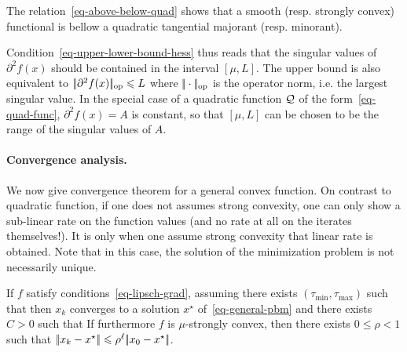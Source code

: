 The relation~\eqref{eq-above-below-quad} shows that a smooth (resp. strongly convex) functional is bellow a quadratic tangential majorant (resp. minorant). 

Condition~\eqref{eq-upper-lower-bound-hess} thus reads that the singular values of $\partial^2 f(x)$ should be contained in the interval $[\mu,L]$. The upper bound is also equivalent to $|\!| \partial^2 f(x) |\!|_{\text{op}} \leqslant L$ where $|\!| \cdot |\!|_{\text{op}}$ is the operator norm, i.e. the largest singular value. 
%
In the special case of a quadratic function $\mathcal{Q}$ of the form~\eqref{eq-quad-func}, $\partial^2 f(x)=A$ is constant, so that $[\mu,L]$ can be chosen to be the range of the singular values of $A$.

\paragraph{Convergence analysis.}

We now give convergence theorem for a general convex function. On contrast to quadratic function, if one does not assumes strong convexity, one can only show a sub-linear rate on the function values (and no rate at all on the iterates themselves!). It is only when one assume strong convexity that linear rate is obtained. 
%
Note that in this case, the solution of the minimization problem is not necessarily unique.

\begin{thm}\label{thm-gradsec-non-strong-conv}
	If $f$ satisfy conditions~\eqref{eq-lipsch-grad}, assuming there exists $(\tau_{\min},\tau_{\max})$ such that
	then $x_k$ converges to a solution $x^\star$ of~\eqref{eq-general-pbm} and
	there exists $C>0$ such that 
	If furthermore $f$ is $\mu$-strongly convex, then there exists $0 \leq \rho < 1$ such that $|\!| x_k-x^\star |\!| \leqslant \rho^\ell |\!| x_0-x^\star |\!|$.
\end{thm}


